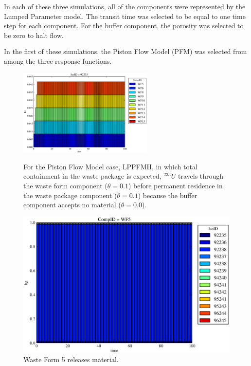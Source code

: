 
In each of these three simulations, all of the components were represented 
by the Lumped Parameter model.  The transit time was selected to be equal to one time step for each component. For the buffer component, the porosity was selected to be zero to halt flow.


In the first of these simulations, the Piston Flow Model (PFM) was 
selected from among the three response functions. 
\begin{figure}[ht!]
\centering
\includegraphics[width=0.6\textwidth]{./chapters/demonstration/base/lpPFMII.eps}
\caption[$^{235}U$ residence. Lumped Parameter PFM Waste Package No Release.]{
For the Piston Flow Model case, LPPFMII, in which total containment in the waste 
package is expected, $^{235}U$ travels through the waste form component ($\theta 
= 0.1$) before permanent residence in the waste package component ($\theta = 
0.1$) because the buffer component accepts no material ($\theta = 0.0$).  }
\label{fig:lpPFMIIall}
\begin{minipage}[b]{0.45\linewidth}
  \includegraphics[width=\textwidth]{./chapters/demonstration/base/lpPFMII1.eps}
  \caption[Case LPPFMII Waste Form Contaminants.]{
    Waste Form 5 releases material. 
    }
  \label{fig:lpPFMIIwf5}

\end{minipage}
\end{figure}

